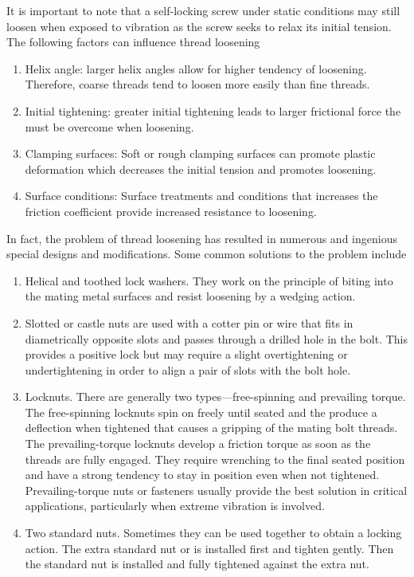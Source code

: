 \documentclass[
10pt,
a4paper,
openany,
svgnames,
]{book}
\begin{document}
It is important to note that a self-locking screw under static conditions may still loosen when exposed to vibration as the screw seeks to relax its initial tension. The following factors can influence thread loosening

\begin{enumerate}
\item Helix angle: larger helix angles allow for higher tendency of loosening. Therefore, coarse threads tend to loosen more easily than fine threads.
\item Initial tightening: greater initial tightening leads to larger frictional force the must be overcome when loosening.
\item Clamping surfaces: Soft or rough clamping surfaces can promote plastic deformation which decreases the initial tension and promotes loosening.
\item Surface conditions: Surface treatments and conditions that increases the friction coefficient provide increased resistance to loosening.
\end{enumerate}
  
In fact, the problem of thread loosening has resulted in numerous and ingenious special designs and modifications. Some common solutions to the problem include

\begin{enumerate}
\item Helical and toothed lock washers. They work on the principle of biting into the mating metal surfaces and resist loosening by a wedging action.
\item Slotted or castle nuts are used with a cotter pin or wire that fits in diametrically opposite slots and passes through a drilled hole in the bolt. This provides a positive lock but may require a slight overtightening or undertightening in order to align a pair of slots with the bolt hole.
\item Locknuts. There are generally two types—free-spinning and prevailing torque. The free-spinning locknuts spin on freely until seated and the produce a deflection when tightened that causes a gripping of the mating bolt threads. The prevailing-torque locknuts develop a friction torque as soon as the threads are fully engaged. They require wrenching to the final seated position and have a strong tendency to stay in position even when not tightened. Prevailing-torque nuts or fasteners usually provide the best solution in critical applications, particularly when extreme vibration is involved.
\item Two standard nuts. Sometimes they can be used together to obtain a locking action. The extra standard nut or is installed first and tighten gently. Then the standard nut is installed and fully tightened against the extra nut.
\end{enumerate}
\end{document}
